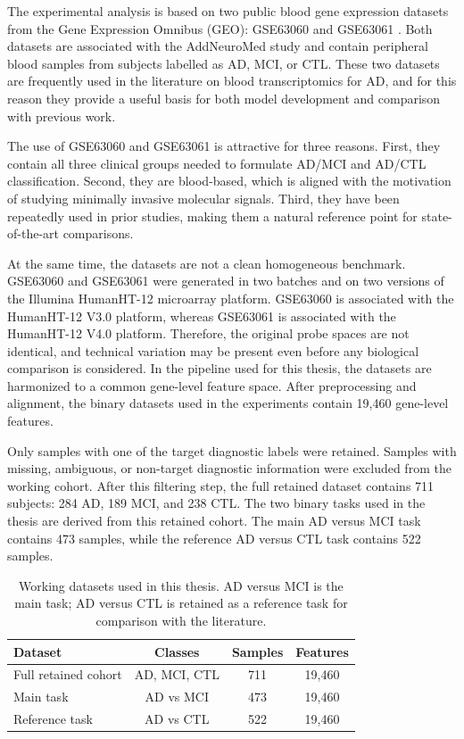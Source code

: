 The experimental analysis is based on two public blood gene expression datasets from the Gene Expression Omnibus (GEO): GSE63060 and GSE63061 \cite{barrett2013geo}. Both datasets are associated with the AddNeuroMed study and contain peripheral blood samples from subjects labelled as AD, MCI, or CTL. These two datasets are frequently used in the literature on blood transcriptomics for AD, and for this reason they provide a useful basis for both model development and comparison with previous work.

The use of GSE63060 and GSE63061 is attractive for three reasons. First, they contain all three clinical groups needed to formulate AD/MCI and AD/CTL classification. Second, they are blood-based, which is aligned with the motivation of studying minimally invasive molecular signals. Third, they have been repeatedly used in prior studies, making them a natural reference point for state-of-the-art comparisons.

At the same time, the datasets are not a clean homogeneous benchmark. GSE63060 and GSE63061 were generated in two batches and on two versions of the Illumina HumanHT-12 microarray platform. GSE63060 is associated with the HumanHT-12 V3.0 platform, whereas GSE63061 is associated with the HumanHT-12 V4.0 platform. Therefore, the original probe spaces are not identical, and technical variation may be present even before any biological comparison is considered. In the pipeline used for this thesis, the datasets are harmonized to a common gene-level feature space. After preprocessing and alignment, the binary datasets used in the experiments contain 19,460 gene-level features.

Only samples with one of the target diagnostic labels were retained. Samples with missing, ambiguous, or non-target diagnostic information were excluded from the working cohort. After this filtering step, the full retained dataset contains 711 subjects: 284 AD, 189 MCI, and 238 CTL. The two binary tasks used in the thesis are derived from this retained cohort. The main AD versus MCI task contains 473 samples, while the reference AD versus CTL task contains 522 samples.

\begin{table}[htbp]
\centering
\caption{Working datasets used in this thesis. AD versus MCI is the main task; AD versus CTL is retained as a reference task for comparison with the literature.}
\label{tab:working-datasets}
\begin{tabular}{lccc}
\hline
Dataset & Classes & Samples & Features \\
\hline
Full retained cohort & AD, MCI, CTL & 711 & 19,460 \\
Main task & AD vs MCI & 473 & 19,460 \\
Reference task & AD vs CTL & 522 & 19,460 \\
\hline
\end{tabular}
\end{table}

